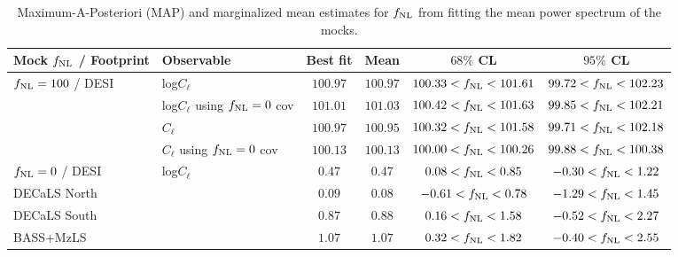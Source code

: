 \begin{table}
  \begin{center}
    \caption{Maximum-A-Posteriori (MAP) and marginalized mean estimates for $f_{\rm NL}$ from fitting the mean power spectrum of the mocks.}
    \label{tab:mocksmcmc}
    \begin{tabular}{llcccc}
    \hline
    \hline
Mock $f_{\rm NL}$ /  Footprint   &  Observable & 	Best fit  & Mean & $ 68\%$ CL & $ 95\%$ CL \\
    \hline
$f_{\rm NL}=100$ / DESI &log$C_{\ell}$                           & $100.97$& $100.97$& $100.33<f_{\rm NL}<101.61$& $ 99.72<f_{\rm NL}<102.23$\\
&log$C_{\ell}$ using $f_{\rm NL}=0$ cov  & $101.01$& $101.03$& $100.42<f_{\rm NL}<101.63$& $ 99.85<f_{\rm NL}<102.21$\\
&$C_{\ell}$                              & $100.97$& $100.95$& $100.32<f_{\rm NL}<101.58$& $ 99.71<f_{\rm NL}<102.18$\\
&$C_{\ell}$ using $f_{\rm NL}=0$ cov     & $100.13$& $100.13$& $100.00<f_{\rm NL}<100.26$& $ 99.88<f_{\rm NL}<100.38$\\
\hline
$f_{\rm NL}=0$ / DESI  & log$C_{\ell}$   & $  0.47$& $  0.47$& $  0.08<f_{\rm NL}<  0.85$& $ -0.30<f_{\rm NL}<  1.22$\\
 DECaLS North       &                 & $  0.09$& $  0.08$& $ -0.61<f_{\rm NL}<  0.78$& $ -1.29<f_{\rm NL}<  1.45$\\
 DECaLS South      &                  & $  0.87$& $  0.88$& $  0.16<f_{\rm NL}<  1.58$& $ -0.52<f_{\rm NL}<  2.27$\\
 BASS+MzLS           &               & $  1.07$& $  1.07$& $  0.32<f_{\rm NL}<  1.82$& $ -0.40<f_{\rm NL}<  2.55$\\
    \end{tabular}
  \end{center}
\end{table}



